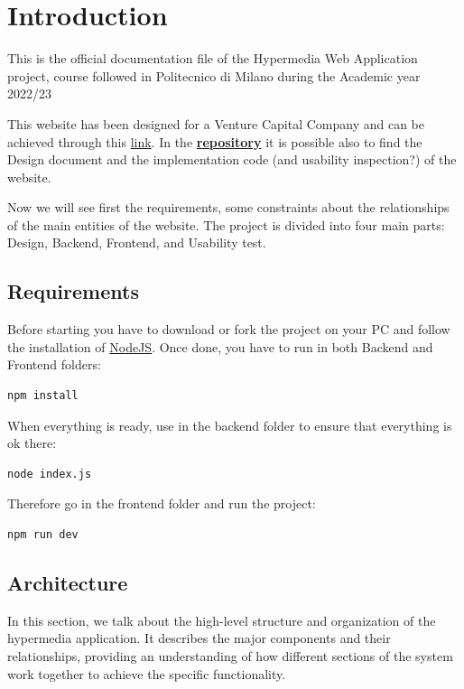 \documentclass[12pt]{article}
\begin{document}
	\newpage
 \section{Introduction}\label{venTour-website}
This is the official documentation file of the Hypermedia Web Application project, course followed in Politecnico di Milano during the Academic year 2022/23

This website has been designed for a Venture Capital Company and can be achieved through this \href{https://rkomi98.github.io/VenTour/}{link}. In the \href{https://github.com/Rkomi98/VenTour}{\textbf{repository}} it is possible also to find the Design document and the implementation code (and usability inspection?) of the website.

Now we will see first the requirements, some constraints about the relationships of the main entities of the website. The project is divided into four main parts: Design, Backend, Frontend, and Usability test.

\subsection{Requirements}\label{requirements}
Before starting you have to download or fork the project on your PC and follow the installation of \href{https://nodejs.org/en}{NodeJS}. Once done, you have to run in both Backend and Frontend folders:

\begin{lstlisting}
npm install
\end{lstlisting}

When everything is ready, use in the backend folder to ensure that everything is ok there:

\begin{lstlisting}
node index.js
\end{lstlisting}

Therefore go in the frontend folder and run the project:

\begin{lstlisting}
npm run dev
\end{lstlisting}

\subsection{Architecture}\label{architecture}
In this section, we talk about the high-level structure and organization of the hypermedia application. It describes the major components and their relationships, providing an understanding of how different sections of the system work together to achieve the specific functionality.
\end{document}
